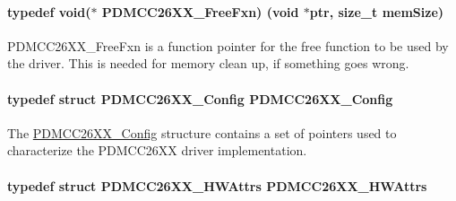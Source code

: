 \paragraph[{P\+D\+M\+C\+C26\+X\+X\+\_\+\+Free\+Fxn}]{\setlength{\rightskip}{0pt plus 5cm}typedef void($\ast$ P\+D\+M\+C\+C26\+X\+X\+\_\+\+Free\+Fxn) (void $\ast$ptr, size\+\_\+t mem\+Size)}\label{_p_d_m_c_c26_x_x_8h_af95e29fbea1fadfb011e4ceaa36f1ab0}


P\+D\+M\+C\+C26\+X\+X\+\_\+\+Free\+Fxn is a function pointer for the free function to be used by the driver. This is needed for memory clean up, if something goes wrong. 

\paragraph[{P\+D\+M\+C\+C26\+X\+X\+\_\+\+Config}]{\setlength{\rightskip}{0pt plus 5cm}typedef struct {\bf P\+D\+M\+C\+C26\+X\+X\+\_\+\+Config}  {\bf P\+D\+M\+C\+C26\+X\+X\+\_\+\+Config}}\label{_p_d_m_c_c26_x_x_8h_acfb1c3839ec53d02703f67f884760119}


The \hyperlink{struct_p_d_m_c_c26_x_x___config}{P\+D\+M\+C\+C26\+X\+X\+\_\+\+Config} structure contains a set of pointers used to characterize the P\+D\+M\+C\+C26\+X\+X driver implementation. 

\paragraph[{P\+D\+M\+C\+C26\+X\+X\+\_\+\+H\+W\+Attrs}]{\setlength{\rightskip}{0pt plus 5cm}typedef struct {\bf P\+D\+M\+C\+C26\+X\+X\+\_\+\+H\+W\+Attrs}  {\bf P\+D\+M\+C\+C26\+X\+X\+\_\+\+H\+W\+Attrs}}\label{_p_d_m_c_c26_x_x_8h_a0188ef7df22961ba87b588d2913e793e}



